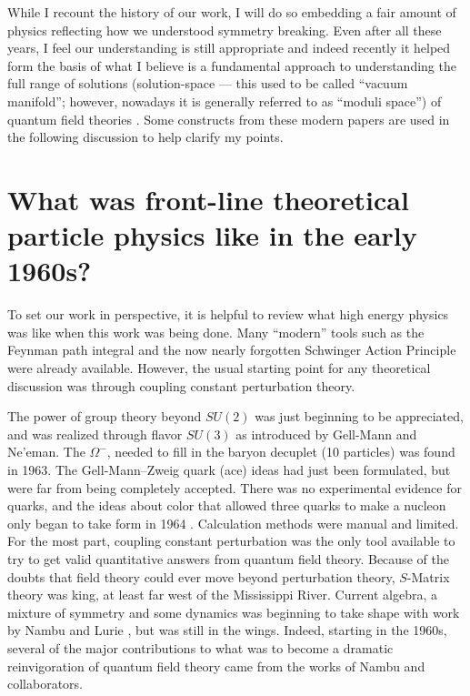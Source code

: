 \documentclass[12pt]{article}
\begin{document}
While I recount the history of our work, I will do so embedding a fair
amount of physics reflecting how we understood symmetry breaking. Even
after all these years, I feel our understanding is still appropriate
and indeed recently it helped form the basis of what I believe is a
fundamental approach to understanding the full range of solutions
(solution-space  --- this used to be called ``vacuum manifold''; however,
nowadays it is generally referred to as ``moduli space'') of quantum
field theories \cite{ggg;1996,ggzg;2007}. Some constructs from these
modern papers are used in the following discussion to help clarify my points.

\section{What was front-line theoretical particle physics like in the
    early 1960s?} \label{sec:1}
  To set our work in perspective, it is helpful to review what high energy
  physics was like when this work was being done. Many ``modern'' tools such as the
  Feynman path integral and the now nearly forgotten Schwinger Action
  Principle were already available. However, the usual starting point for any
  theoretical discussion was through coupling constant perturbation theory.

  The power of group theory beyond $SU(2)$ was just
  beginning to be appreciated, and was realized through flavor $SU(3)$ as introduced by
  Gell-Mann and Ne'eman. The $\Omega^{-}$, needed to fill in the baryon decuplet (10
  particles) was found in 1963. The Gell-Mann--Zweig quark (ace) ideas had just
  been formulated, but were far from being completely accepted. There was no
  experimental evidence for quarks, and the ideas about color that allowed three quarks to make a
  nucleon only began to take form in 1964 \cite{greenb;1964}. Calculation
  methods were manual and limited. For the most part, coupling constant
  perturbation was the only tool available to try to get valid quantitative
  answers from quantum field theory. Because of the doubts
  that field theory could ever move beyond perturbation theory, $S$-Matrix theory
  was king, at least far west of the Mississippi River. Current algebra, a mixture of
  symmetry and some dynamics was beginning to take shape with work by Nambu and Lurie
   \cite{nl;1961}, but was still in the wings.  Indeed, starting in the 1960s, several of the major
  contributions to what was to become a dramatic reinvigoration of quantum field
  theory came from the works of Nambu and collaborators.
\end{document}
